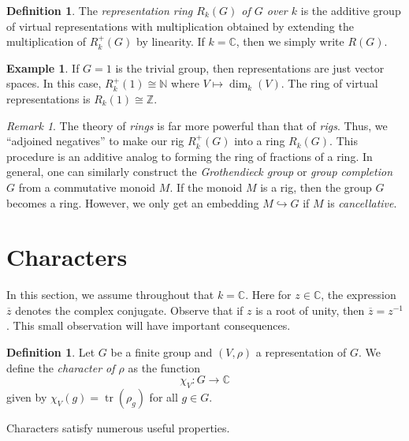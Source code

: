 \documentclass[12pt]{article}
\theoremstyle{plain}
\theoremstyle{definition}
\newtheorem{definition}[theorem]{Definition}
\newtheorem{example}[theorem]{Example}
\theoremstyle{remark}
\newtheorem{remark}[theorem]{Remark}
\numberwithin{equation}{section}
\begin{document}
\begin{definition}
The \emph{representation ring $R_k(G)$ of $G$ over $k$} is
the additive group of virtual representations with multiplication
obtained by extending the multiplication of $R^+_k(G)$ by linearity.
If $k=\mathbb{C}$, then we simply write $R(G)$.
\end{definition}

\begin{example}
If $G=1$ is the trivial group, then representations are just vector spaces.
In this case, $R^+_k(1) \cong \mathbb{N}$ where $V \mapsto \dim_k(V)$.
The ring of virtual representations is $R_k(1) \cong \mathbb{Z}$.
\end{example}

\begin{remark}
The theory of \emph{rings} is far more powerful than that of \emph{rigs}.
Thus, we ``adjoined negatives'' to make our rig $R^+_k(G)$
into a ring $R_k(G)$.
This procedure is an additive analog to forming the ring of fractions of a ring.
In general, one can similarly construct the \emph{Grothendieck group}
or \emph{group completion} $G$ from a commutative monoid $M$.
If the monoid $M$ is a rig, then the group $G$ becomes a ring.
However, we only get an embedding $M \hookrightarrow G$ if
$M$ is \emph{cancellative}.
\end{remark}

\section{Characters}

In this section, we assume throughout that $k=\mathbb{C}$.
Here for $z \in \mathbb{C}$, the expression $\overline{z}$ denotes the
complex conjugate.  Observe that if $z$ is a root of unity, then
$\overline{z}=z^{-1}$.  This small observation will have important
consequences.

\begin{definition}
Let $G$ be a finite group and $(V,\rho)$ a representation of $G$.
We define the \emph{character of $\rho$} as the function
\[
\chi_V : G \to \mathbb{C}
\]
given by $\chi_V(g)=\operatorname{tr}(\rho_g)$ for all $g \in G$. 
\end{definition}

Characters satisfy numerous useful properties.
\end{document}
